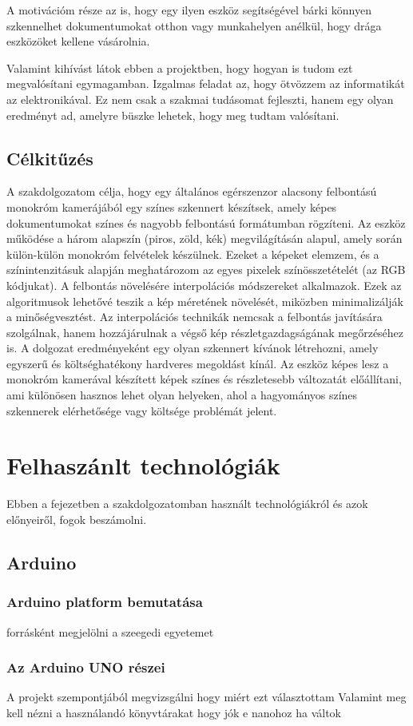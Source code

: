 \documentclass[]{thesis-ekf}
\theoremstyle{definition}
\theoremstyle{remark}
\begin{document}
A motivációm része az is, hogy egy ilyen eszköz segítségével bárki könnyen szkennelhet dokumentumokat otthon vagy munkahelyen anélkül, hogy drága eszközöket kellene vásárolnia. 

Valamint kihívást látok ebben a projektben, hogy hogyan is tudom ezt megvalósítani egymagamban. Izgalmas feladat az, hogy ötvözzem az informatikát az elektronikával. Ez nem csak a szakmai tudásomat fejleszti, hanem egy olyan eredményt ad, amelyre büszke lehetek, hogy meg tudtam valósítani.
\section{Célkitűzés}
A szakdolgozatom célja, hogy egy általános egérszenzor alacsony felbontású monokróm kamerájából egy színes szkennert készítsek, amely képes dokumentumokat színes és nagyobb felbontású formátumban rögzíteni. Az eszköz működése a három alapszín (piros, zöld, kék) megvilágításán alapul, amely során külön-külön monokróm felvételek készülnek. Ezeket a képeket elemzem, és a színintenzitásuk alapján meghatározom az egyes pixelek színösszetételét (az RGB kódjukat). A felbontás növelésére interpolációs módszereket alkalmazok. Ezek az algoritmusok lehetővé teszik a kép méretének növelését, miközben minimalizálják a minőségvesztést. Az interpolációs technikák nemcsak a felbontás javítására szolgálnak, hanem hozzájárulnak a végső kép részletgazdagságának megőrzéséhez is. A dolgozat eredményeként egy olyan szkennert kívánok létrehozni, amely egyszerű és költséghatékony hardveres megoldást kínál. Az eszköz képes lesz a monokróm kamerával készített képek színes és részletesebb változatát előállítani, ami különösen hasznos lehet olyan helyeken, ahol a hagyományos színes szkennerek elérhetősége vagy költsége problémát jelent.
\chapter{Felhaszánlt technológiák}
Ebben a fejezetben a szakdolgozatomban használt technológiákról és azok előnyeiről, fogok beszámolni.
\section{Arduino}
\subsection{Arduino platform bemutatása}

forrásként megjelölni a szeegedi egyetemet
\subsection{Az Arduino UNO részei}
A projekt szempontjából megvizsgálni hogy miért ezt választottam
Valamint meg kell nézni a használandó könyvtárakat hogy jók e nanohoz ha váltok
\end{document}
